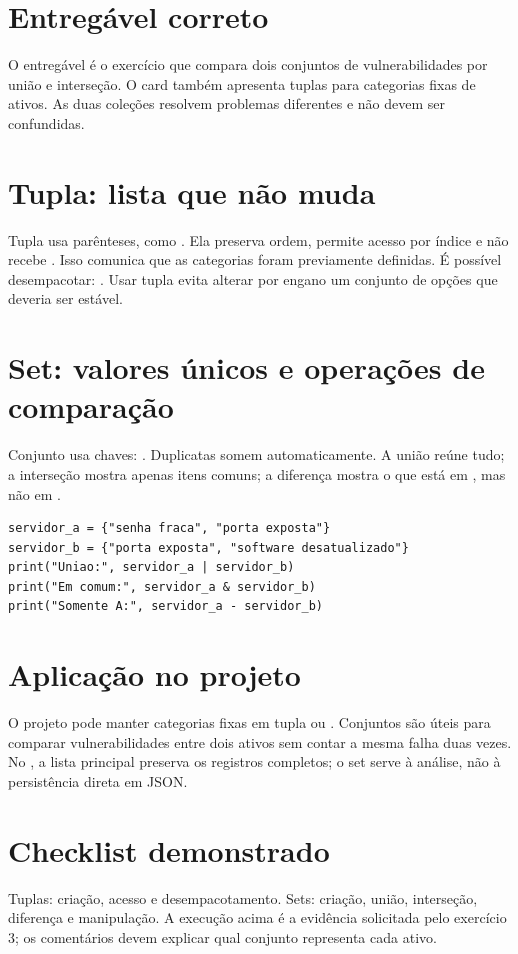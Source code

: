 \documentclass[11pt,a4paper]{article}
\begin{document}
\section*{Entregável correto}
O entregável é o exercício que compara dois conjuntos de vulnerabilidades por união e interseção. O card também apresenta tuplas para categorias fixas de ativos. As duas coleções resolvem problemas diferentes e não devem ser confundidas.
\section*{Tupla: lista que não muda}
Tupla usa parênteses, como . Ela preserva ordem, permite acesso por índice e não recebe . Isso comunica que as categorias foram previamente definidas. É possível desempacotar: . Usar tupla evita alterar por engano um conjunto de opções que deveria ser estável.
\section*{Set: valores únicos e operações de comparação}
Conjunto usa chaves: . Duplicatas somem automaticamente. A união  reúne tudo; a interseção  mostra apenas itens comuns; a diferença  mostra o que está em , mas não em .
\begin{lstlisting}
servidor_a = {"senha fraca", "porta exposta"}
servidor_b = {"porta exposta", "software desatualizado"}
print("Uniao:", servidor_a | servidor_b)
print("Em comum:", servidor_a & servidor_b)
print("Somente A:", servidor_a - servidor_b)
\end{lstlisting}
\section*{Aplicação no projeto}
O projeto pode manter categorias fixas em tupla ou . Conjuntos são úteis para comparar vulnerabilidades entre dois ativos sem contar a mesma falha duas vezes. No , a lista principal preserva os registros completos; o set serve à análise, não à persistência direta em JSON.
\section*{Checklist demonstrado}
Tuplas: criação, acesso e desempacotamento. Sets: criação, união, interseção, diferença e manipulação. A execução acima é a evidência solicitada pelo exercício 3; os comentários devem explicar qual conjunto representa cada ativo.
\end{document}
